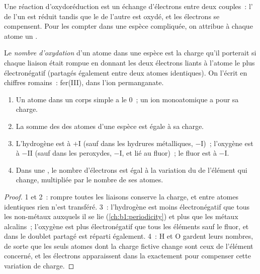 Une réaction d'oxydoréduction est un échange d'électrons entre deux
couples~: l' de l'un est réduit tandis que le  de
l'autre est oxydé, et les électrons se compensent. Pour les compter dans
une espèce compliquée, on attribue à chaque atome un .

\begin{definition}\label{def:b1:nernst:oxidation-number}
Le \emph{nombre d'oxydation} d'un atome dans une
espèce est la charge qu'il porterait si chaque liaison était rompue en
donnant les deux électrons liants à l'atome le plus électronégatif
(partagés également entre deux atomes identiques). On l'écrit en chiffres
romains~: fer(III),  dans l'ion permanganate.
\end{definition}

\begin{proposition}\label{prop:b1:nernst:on-rules}
\begin{enumerate}
  \item Un atome dans un corps simple a le  0~; un ion
        monoatomique a pour  sa charge.
  \item La somme des  des atomes d'une espèce est
        égale à sa charge.
  \item L'hydrogène est à $+$I (sauf dans les hydrures métalliques,
        $-$I)~; l'oxygène est à $-$II (sauf dans les peroxydes, $-$I, et
        lié au fluor)~; le fluor est à $-$I.
  \item Dans une , le nombre d'électrons est égal à la
        variation du  de l'élément qui change, multipliée
        par le nombre de ses atomes.
\end{enumerate}
\end{proposition}

\begin{proof}
1 et 2~: rompre toutes les liaisons conserve la charge, et entre atomes
identiques rien n'est transféré. 3~: l'hydrogène est moins
électronégatif que tous les non-métaux auxquels il se lie
(\cref{ch:b1:periodicity}) et plus que les métaux alcalins~; l'oxygène
est plus électronégatif que tous les éléments sauf le fluor, et dans
 le doublet partagé est réparti également. 4~: H et O gardent
leurs nombres, de sorte que les seuls atomes dont la charge fictive
change sont ceux de l'élément concerné, et les électrons apparaissent
dans la  exactement pour compenser cette variation de
charge.
\end{proof}

